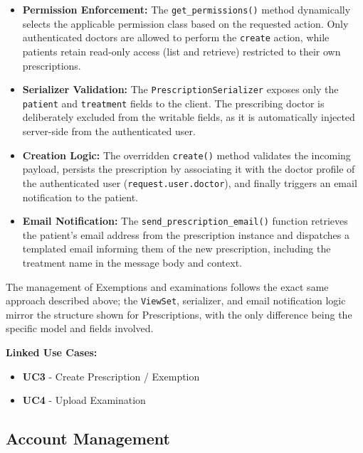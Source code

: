 \begin{itemize}
    \item \textbf{Permission Enforcement:} The \texttt{get\_permissions()} method dynamically selects the applicable permission class based on the requested action. Only authenticated doctors are allowed to perform the \texttt{create} action, while patients retain read-only access (list and retrieve) restricted to their own prescriptions.
    \item \textbf{Serializer Validation:} The \texttt{PrescriptionSerializer} exposes only the \texttt{patient} and \texttt{treatment} fields to the client. The prescribing doctor is deliberately excluded from the writable fields, as it is automatically injected server-side from the authenticated user.
    \item \textbf{Creation Logic:} The overridden \texttt{create()} method validates the incoming payload, persists the prescription by associating it with the doctor profile of the authenticated user (\texttt{request.user.doctor}), and finally triggers an email notification to the patient.
    \item \textbf{Email Notification:} The \texttt{send\_prescription\_email()} function retrieves the patient's email address from the prescription instance and dispatches a templated email informing them of the new prescription, including the treatment name in the message body and context.
\end{itemize}

\vspace{0.2cm}

\vspace{0.2cm}
\noindent The management of Exemptions and examinations follows the exact same approach described above; the \texttt{ViewSet}, serializer, and email notification logic mirror the structure shown for Prescriptions, with the only difference being the specific model and fields involved.

\vspace{0.5cm}
\noindent\textbf{Linked Use Cases:}
\begin{itemize}
    \item \textbf{UC3} - Create Prescription / Exemption
    \item \textbf{UC4} - Upload Examination
\end{itemize}


\subsection{Account Management}

